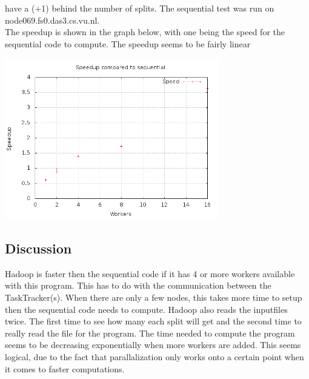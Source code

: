 \documentclass[a4paper]{article}
\begin{document}
    have a (+1) behind the number of splits.
    The sequential test was run on node069.fs0.das3.cs.vu.nl.\\
    The speedup is shown in the graph below, with one being the
    speed for the sequential code to compute. The speedup seems to be fairly linear
    \begin{center}
      \includegraphics[width=0.7\textwidth]{speedup.png}
    \end{center}
  \subsection{Discussion}
    Hadoop is faster then the sequential code if it has 4 or more workers
    available with this program. This has to do with the communication
    between the TaskTracker(s). When there are only a few nodes,
    this takes more time to setup then the sequential code needs to compute.
    Hadoop also reads the inputfiles twice. The first time to see how many
    each split will get and the second time to really read the file for the program.
    The time needed to compute the program seems to be decreasing exponentially
    when more workers are added. This seems logical, due to the fact that
    parallalization only works onto a certain point when it comes to faster
    computations.
  
\end{document}
